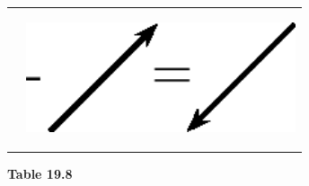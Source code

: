 \begin{center}
\begin{xtabular*}{\mytablewidth}[t]{|p{10\mystarwidth}|p{10\mystarwidth}|}
    \addtocounter{footnote}{-0}
    
                 &
    
    
        
                  
    \setcounter{subfigure}{0}

\label{m38813*id188950}
    \begin{center}
    \label{m38813*id188950!!!underscore!!!media}\label{m38813*id188950!!!underscore!!!printimage}\includegraphics[width=300px]{col11305.imgs/m38813_PG11C1_036.png} %
        
      \vspace{2pt}
    \vspace{.1in}
    
    \end{center}



    \addtocounter{footnote}{-0}
    
     \tabularnewline{}
    \end{xtabular*}
      \end{center}
    \begin{center}{\small\bfseries Table 19.8}\end{center}
    
    \addtocounter{footnote}{-0}
    
    \par
  
